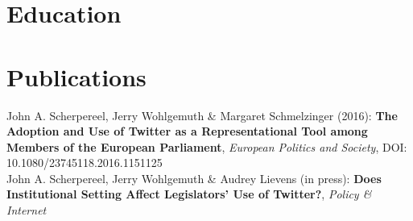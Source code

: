 \documentclass[10pt,a4paper,merriweather]{moderncv}        %
\begin{document}

\section{Education}

\section{Publications}
\small John A. Scherpereel, Jerry Wohlgemuth \& Margaret Schmelzinger (2016): \textbf{The Adoption and Use of Twitter as a Representational
Tool among Members of the European Parliament}, \textit{European Politics and Society}, DOI: 10.1080/23745118.2016.1151125
\vspace{0.15cm}
\\
\small John A. Scherpereel, Jerry Wohlgemuth \& Audrey Lievens (in press): \textbf{Does Institutional Setting Affect Legislators’ Use of Twitter?}, \textit{Policy \& Internet}

\clearpage





\end{document}
